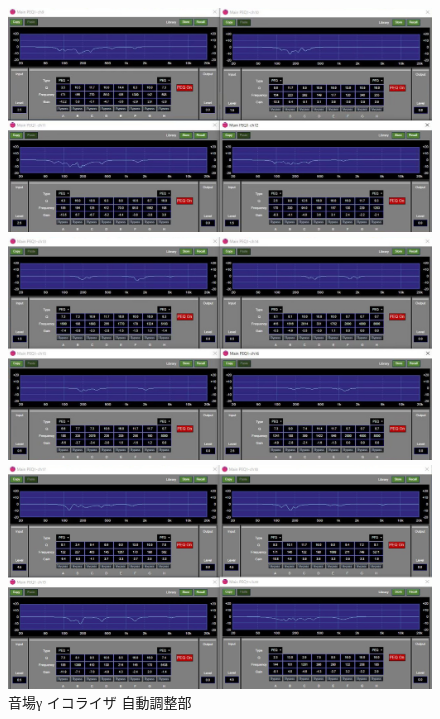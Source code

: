\documentclass[11pt,a4j]{jreport}
\begin{document}
\begin{figure}[H]
  \begin{minipage}[b]{.5\linewidth}
    \centering
    \includegraphics[width=.9\linewidth]{images/experimentField/afcParameters/03gamma/03autoEQ3.jpg}
  \end{minipage}%
  \begin{minipage}[b]{.5\linewidth}
    \centering
    \includegraphics[width=.9\linewidth]{images/experimentField/afcParameters/03gamma/03autoEQ4.jpg}
  \end{minipage}

  \begin{minipage}[b]{1\linewidth}
    \centering
    \includegraphics[width=.45\linewidth]{images/experimentField/afcParameters/03gamma/03autoEQ5.jpg}
  \end{minipage}

  \centering
  \caption{音場γ イコライザ 自動調整部}
  \label{fig:gammaイコライザ自動調整部}
\end{figure}
\newpage
\end{document}
